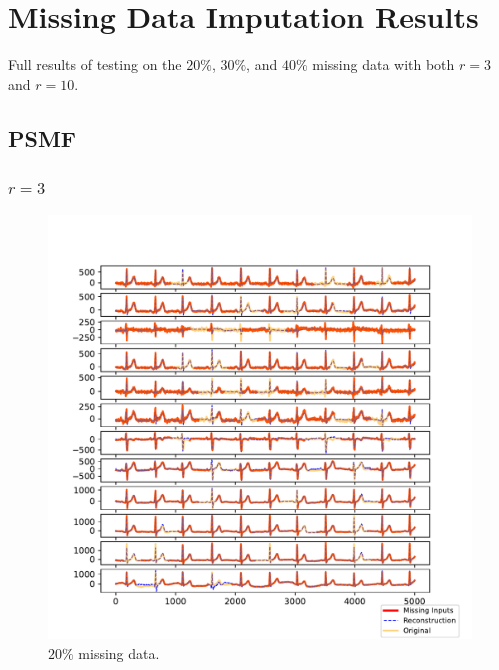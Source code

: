 \documentclass{mldsmsc}
\begin{document}
\chapter{Missing Data Imputation Results}

Full results of testing on the $20\%$, $30\%$, and $40\%$ missing data with both $r = 3$ and $r = 10$.

\section{PSMF}

\subsection{$r = 3$}

\begin{figure}[H]
\centering
\begin{minipage}{0.4\linewidth}
    \centering
    \includegraphics[width=\linewidth]{images/missing/psmf_output_20_3.pdf}
    \caption{$20\%$ missing data.}
\end{minipage}%
\hspace{0.05\linewidth}
\begin{minipage}{0.4\linewidth}
    \centering

\end{minipage}
\end{figure}
\end{document}

